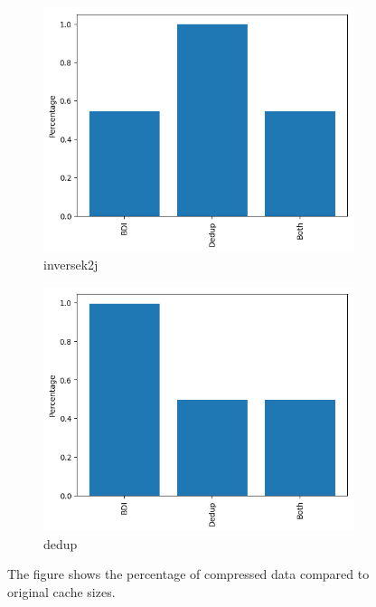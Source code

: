 \begin{figure}
    \begin{subfigure}{\textwidth}
        \includegraphics[width=\textwidth]{inversek2j.png}
        \caption{inversek2j}
        \label{fig:inversek2j}
    \end{subfigure}
    \begin{subfigure}{\textwidth}
        \includegraphics[width=\textwidth]{dedup.png}
        \caption{dedup}
        \label{fig:dedup}
    \end{subfigure}
    \caption[Compression in benchmarks1]{The figure shows the percentage of compressed data compared to original cache sizes.}
\end{figure}
